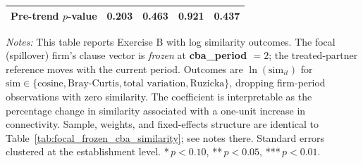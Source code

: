\begin{table}[H]
\begin{tabular}{lcccc}
Pre-trend $p$-value & 0.203 & 0.463 & 0.921 & 0.437 \\
\hline\hline
\end{tabular}
\begin{minipage}{\linewidth}
\smallskip
\scriptsize\textit{Notes:} This table reports Exercise B with log similarity outcomes. The focal (spillover) firm's clause vector is \emph{frozen} at \textbf{cba\_period $= 2$}; the treated-partner reference moves with the current period. Outcomes are $\ln(\text{sim}_{it})$ for $\text{sim} \in \{\text{cosine}, \text{Bray-Curtis}, \text{total variation}, \text{Ruzicka}\}$, dropping firm-period observations with zero similarity. The coefficient is interpretable as the percentage change in similarity associated with a one-unit increase in connectivity. Sample, weights, and fixed-effects structure are identical to Table~\ref{tab:focal_frozen_cba_similarity}; see notes there. Standard errors clustered at the establishment level. *\,$p<0.10$, **\,$p<0.05$, ***\,$p<0.01$.
\end{minipage}
\end{table}
